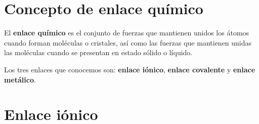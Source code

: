 \section{Concepto de enlace químico}\label{sec:concepto-de-enlace-quimico}

    \begin{definition}
        El \textbf{enlace químico} es el conjunto de fuerzas que mantienen unidos los átomos cuando forman moléculas o cristales, así como las fuerzas que mantienen unidas las moléculas cuando se presentan en estado sólido o líquido.
    \end{definition}

Los tres enlaces que conocemos son: \textbf{enlace iónico}, \textbf{enlace covalente} y \textbf{enlace metálico}.

%
%


\section{Enlace iónico}\label{sec:enlace-ionico}


